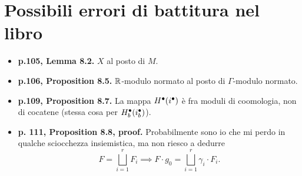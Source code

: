 \section*{Possibili errori di battitura nel libro} 
\begin{itemize}
\item \textbf{p.105, Lemma 8.2.} $X$ al posto di $M$.
\item \textbf{p.106, Proposition 8.5.} $\mathbb{R}$-modulo normato al posto di $\Gamma$-modulo normato.
\item \textbf{p.109, Proposition 8.7.} La mappa $H^\bullet(i^\bullet)$ è fra moduli di coomologia, non di cocatene (stessa cosa per $H^\bullet_b(i^\bullet_b)$).
\item \textbf{p. 111, Proposition 8.8, proof.} Probabilmente sono io che mi perdo in qualche sciocchezza insiemistica, ma non riesco a dedurre
\[
F=\bigsqcup_{i=1}^r F_i\implies F\cdot g_0=\bigsqcup_{i=1}^r \gamma_i\cdot F_i.
\]
\end{itemize}